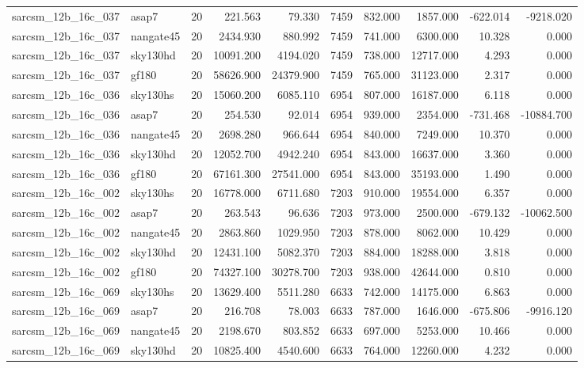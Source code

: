 \begin{tabular}{llrrrrrrrr}
sarcsm\_12b\_16c\_037 & asap7 & 20 & 221.563 & 79.330 & 7459 & 832.000 & 1857.000 & -622.014 & -9218.020 \\
sarcsm\_12b\_16c\_037 & nangate45 & 20 & 2434.930 & 880.992 & 7459 & 741.000 & 6300.000 & 10.328 & 0.000 \\
sarcsm\_12b\_16c\_037 & sky130hd & 20 & 10091.200 & 4194.020 & 7459 & 738.000 & 12717.000 & 4.293 & 0.000 \\
sarcsm\_12b\_16c\_037 & gf180 & 20 & 58626.900 & 24379.900 & 7459 & 765.000 & 31123.000 & 2.317 & 0.000 \\
sarcsm\_12b\_16c\_036 & sky130hs & 20 & 15060.200 & 6085.110 & 6954 & 807.000 & 16187.000 & 6.118 & 0.000 \\
sarcsm\_12b\_16c\_036 & asap7 & 20 & 254.530 & 92.014 & 6954 & 939.000 & 2354.000 & -731.468 & -10884.700 \\
sarcsm\_12b\_16c\_036 & nangate45 & 20 & 2698.280 & 966.644 & 6954 & 840.000 & 7249.000 & 10.370 & 0.000 \\
sarcsm\_12b\_16c\_036 & sky130hd & 20 & 12052.700 & 4942.240 & 6954 & 843.000 & 16637.000 & 3.360 & 0.000 \\
sarcsm\_12b\_16c\_036 & gf180 & 20 & 67161.300 & 27541.000 & 6954 & 843.000 & 35193.000 & 1.490 & 0.000 \\
sarcsm\_12b\_16c\_002 & sky130hs & 20 & 16778.000 & 6711.680 & 7203 & 910.000 & 19554.000 & 6.357 & 0.000 \\
sarcsm\_12b\_16c\_002 & asap7 & 20 & 263.543 & 96.636 & 7203 & 973.000 & 2500.000 & -679.132 & -10062.500 \\
sarcsm\_12b\_16c\_002 & nangate45 & 20 & 2863.860 & 1029.950 & 7203 & 878.000 & 8062.000 & 10.429 & 0.000 \\
sarcsm\_12b\_16c\_002 & sky130hd & 20 & 12431.100 & 5082.370 & 7203 & 884.000 & 18288.000 & 3.818 & 0.000 \\
sarcsm\_12b\_16c\_002 & gf180 & 20 & 74327.100 & 30278.700 & 7203 & 938.000 & 42644.000 & 0.810 & 0.000 \\
sarcsm\_12b\_16c\_069 & sky130hs & 20 & 13629.400 & 5511.280 & 6633 & 742.000 & 14175.000 & 6.863 & 0.000 \\
sarcsm\_12b\_16c\_069 & asap7 & 20 & 216.708 & 78.003 & 6633 & 787.000 & 1646.000 & -675.806 & -9916.120 \\
sarcsm\_12b\_16c\_069 & nangate45 & 20 & 2198.670 & 803.852 & 6633 & 697.000 & 5253.000 & 10.466 & 0.000 \\
sarcsm\_12b\_16c\_069 & sky130hd & 20 & 10825.400 & 4540.600 & 6633 & 764.000 & 12260.000 & 4.232 & 0.000 \\

\end{tabular}
